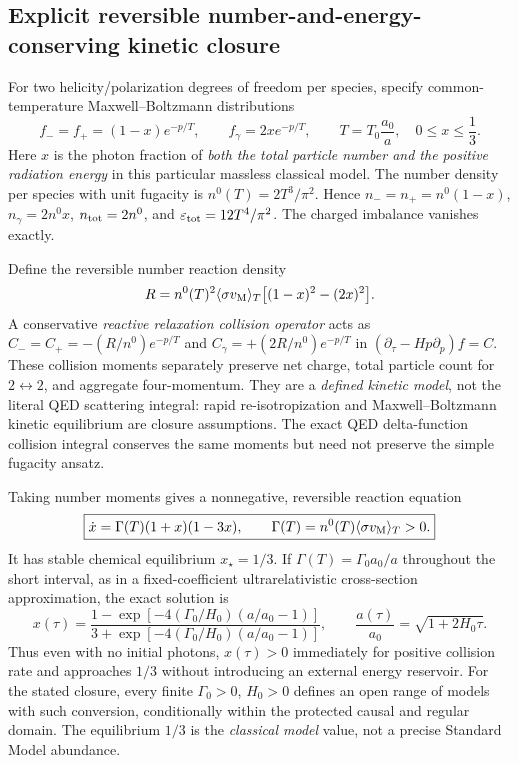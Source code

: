 \documentclass[11pt,a4paper]{article}
\theoremstyle{tmon}
\theoremstyle{definition}
\begin{document}
\subsection{Explicit reversible number-and-energy-conserving kinetic closure}
For two helicity/polarization degrees of freedom per species, specify common-temperature Maxwell--Boltzmann distributions
\begin{equation}\label{eq:e006dist}
 f_-=f_+=(1-x)e^{-p/T},\qquad f_\gamma=2x e^{-p/T},\qquad
 T=T_0\frac{a_0}{a},\quad 0\le x\le\frac13.
\end{equation}
Here $x$ is the photon fraction of \emph{both the total particle number and the positive radiation energy} in this particular massless classical model. The number density per species with unit fugacity is $n^0(T)=2T^3/\pi^2$. Hence $n_-=n_+=n^0(1-x)$, $n_\gamma=2n^0x$, $n_{\rm tot}=2n^0$, and $\varepsilon_{\rm tot}=12T^4/\pi^2$. The charged imbalance vanishes exactly.

Define the reversible number reaction density
\begin{equation}\label{eq:e006rate}
 R=n^0(T)^2\langle\sigma v_{\rm M}\rangle_T\big[(1-x)^2-(2x)^2\big].
\end{equation}
A conservative \emph{reactive relaxation collision operator} acts as $C_-=C_+=-(R/n^0)e^{-p/T}$ and $C_\gamma=+(2R/n^0)e^{-p/T}$ in $(\partial_\tau-Hp\partial_p)f=C$. These collision moments separately preserve net charge, total particle count for $2\leftrightarrow2$, and aggregate four-momentum. They are a \emph{defined kinetic model}, not the literal QED scattering integral: rapid re-isotropization and Maxwell--Boltzmann kinetic equilibrium are closure assumptions. The exact QED delta-function collision integral conserves the same moments but need not preserve the simple fugacity ansatz.

Taking number moments gives a nonnegative, reversible reaction equation
\begin{equation}\label{eq:e006ode}
 \boxed{\dot x=\Gamma(T)(1+x)(1-3x),\qquad
 \Gamma(T)=n^0(T)\langle\sigma v_{\rm M}\rangle_T>0.}
\end{equation}
It has stable chemical equilibrium $x_\star=1/3$. If $\Gamma(T)=\Gamma_0 a_0/a$ throughout the short interval, as in a fixed-coefficient ultrarelativistic cross-section approximation, the exact solution is
\begin{equation}\label{eq:e006solution}
 \boxed{x(\tau)=\frac{1-\exp[-4(\Gamma_0/H_0)(a/a_0-1)]}{3+\exp[-4(\Gamma_0/H_0)(a/a_0-1)]},\qquad
 \frac{a(\tau)}{a_0}=\sqrt{1+2H_0\tau}.}
\end{equation}
Thus even with no initial photons, $x(\tau)>0$ immediately for positive collision rate and approaches $1/3$ without introducing an external energy reservoir. For the stated closure, every finite $\Gamma_0>0$, $H_0>0$ defines an open range of models with such conversion, conditionally within the protected causal and regular domain. The equilibrium $1/3$ is the \emph{classical model} value, not a precise Standard Model abundance.
\end{document}
